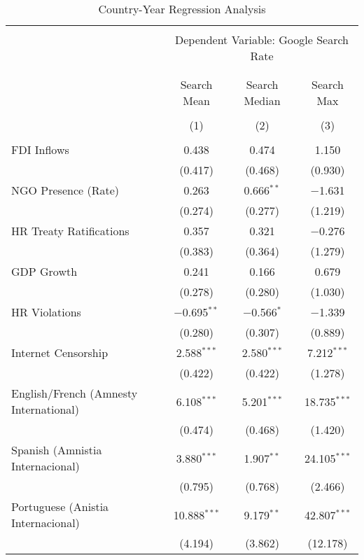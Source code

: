 
\begin{table}[!htbp] \centering 
  \caption{Country-Year Regression Analysis} 
  \label{} 
\begin{tabular}{@{\extracolsep{5pt}}lccc} 
\\[-1.8ex]\hline 
\hline \\[-1.8ex] 
 & \multicolumn{3}{c}{Dependent Variable: Google Search Rate} \\ 
\cline{2-4} 
\\[-1.8ex] & \multicolumn{3}{c}{ } \\ 
 & Search Mean & Search Median & Search Max \\ 
\\[-1.8ex] & (1) & (2) & (3)\\ 
\hline \\[-1.8ex] 
 FDI Inflows & 0.438 & 0.474 & 1.150 \\ 
  & (0.417) & (0.468) & (0.930) \\ 
  NGO Presence (Rate) & 0.263 & 0.666$^{**}$ & $-$1.631 \\ 
  & (0.274) & (0.277) & (1.219) \\ 
  HR Treaty Ratifications & 0.357 & 0.321 & $-$0.276 \\ 
  & (0.383) & (0.364) & (1.279) \\ 
  GDP Growth & 0.241 & 0.166 & 0.679 \\ 
  & (0.278) & (0.280) & (1.030) \\ 
  HR Violations & $-$0.695$^{**}$ & $-$0.566$^{*}$ & $-$1.339 \\ 
  & (0.280) & (0.307) & (0.889) \\ 
  Internet Censorship & 2.588$^{***}$ & 2.580$^{***}$ & 7.212$^{***}$ \\ 
  & (0.422) & (0.422) & (1.278) \\ 
  English/French (Amnesty International) & 6.108$^{***}$ & 5.201$^{***}$ & 18.735$^{***}$ \\ 
  & (0.474) & (0.468) & (1.420) \\ 
  Spanish (Amnistia Internacional) & 3.880$^{***}$ & 1.907$^{**}$ & 24.105$^{***}$ \\ 
  & (0.795) & (0.768) & (2.466) \\ 
  Portuguese (Anistia Internacional) & 10.888$^{***}$ & 9.179$^{**}$ & 42.807$^{***}$ \\ 
  & (4.194) & (3.862) & (12.178) \\ 

\end{tabular}
\end{table}
